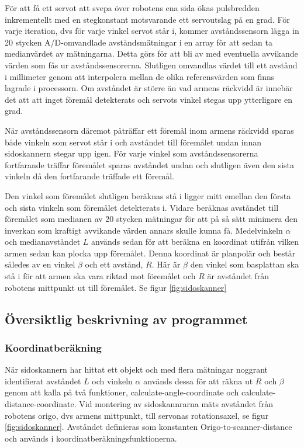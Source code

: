 För att få ett servot att svepa över robotens ena sida ökas pulsbredden inkrementellt med en stegkonstant motsvarande ett servoutslag på en grad. För varje iteration, dvs för varje vinkel servot står i, kommer avståndssensorn lägga in 20 stycken A/D-omvandlade avståndsmätningar i en array för att sedan ta medianvärdet av mätningarna. Detta görs för att bli av med eventuella avvikande värden som fås ur avståndssensorerna. Slutligen omvandlas värdet till ett avstånd i millimeter genom att interpolera mellan de olika referensvärden som finns lagrade i processorn. Om avståndet är större än vad armens räckvidd är innebär det att att inget föremål detekterats och servots vinkel stegas upp ytterligare en grad. 

När avståndssensorn däremot påträffar ett föremål inom armens räckvidd sparas både vinkeln som servot står i och avståndet till föremålet undan innan sidoskannern stegar upp igen. För varje vinkel som avståndssensorerna fortfarande träffar föremålet sparas avståndet undan och slutligen även den sista vinkeln då den fortfarande träffade ett föremål.

Den vinkel som föremålet slutligen beräknas stå i ligger mitt emellan den första och sista vinkeln som föremålet detekterats i. Vidare beräknas avståndet till föremålet som medianen av 20 stycken mätningar för att på så sätt minimera den inverkan som kraftigt avvikande värden annars skulle kunna få. Medelvinkeln $\alpha$ och medianavståndet $L$ används sedan för att beräkna en koordinat utifrån vilken armen sedan kan plocka upp föremålet. Denna koordinat är planpolär och består således av en vinkel $\beta$ och ett avstånd, $R$. Här är $\beta$ den vinkel som basplattan ska stå i för att armen ska vara riktad mot föremålet och $R$ är avståndet från robotens mittpunkt ut till föremålet. Se figur \ref{fig:sidoskanner}

\subsection{Översiktlig beskrivning av programmet}

\subsubsection{Koordinatberäkning}
När sidoskannern har hittat ett objekt och med flera mätningar noggrant identifierat avståndet $L$ och vinkeln $\alpha$ används dessa för att räkna ut $R$ och $\beta$ genom att kalla på två funktioner, calculate-angle-coordinate och calculate-distance-coordinate.
Vid montering av sidoskannrarna mäts avståndet från robotens origo, dvs armens mittpunkt, till servonas rotationsaxel, se figur \ref{fig:sidoskanner}. Avståndet definieras som konstanten Origo-to-scanner-distance och används i koordinatberäkningsfunktionerna.

